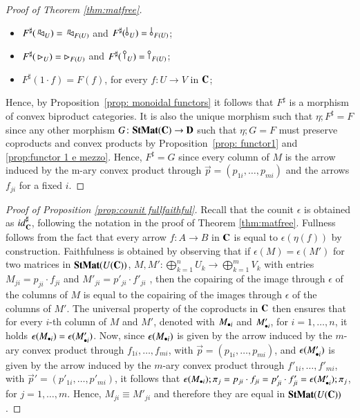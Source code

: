 \begin{proof}[Proof of Theorem \ref{thm:matfree}]
    \begin{itemize}
    \item $F^\sharp(\,^p\!\! \lhd_{U})=\, ^p\!\! \lhd_{F(U)}$ and $F^\sharp(\,\bangp{U})=\, \bangp{F(U)}$;
    \item $F^\sharp(\,\rhd_{U})= \rhd_{F(U)}$ and $F^\sharp(\,\cobang{U})= \cobang{F(U)}$;
    \item $F^\sharp(1\cdot f)= F(f)$, for every $f\colon U\to V$ in $\mathbf{C}$;
    \end{itemize}
     Hence, by Proposition~\ref{prop: monoidal functors} it follows that $F^\sharp$ is a morphism of convex biproduct categories. It is also the unique morphism such that $\eta;F^\sharp = F$ since any other morphism $G\colon\mathbf{StMat}(\mathbf{C})\to \mathbf{D}$ such that $\eta;G=F$ must preserve coproducts and convex products by Proposition~\ref{prop: functor1} and \ref{prop:functor 1 e mezzo}. Hence, $F^\sharp= G$ since every column of $M$ is the arrow induced by the m-ary convex product through $\vec{p}=(p_{1i},\dots,p_{mi})$ and the arrows $f_{ji}$ for a fixed $i$. 
    \end{proof}


\begin{proof}[Proof of Proposition \ref{prop:counit fullfaithful}]\label{proof:counit fullfaithful}
    Recall that the counit $\epsilon$ is obtained as ${id}_{\mathbf{C}}^\sharp$, following the notation in the proof of Theorem \ref{thm:matfree}. Fullness follows from the fact that every arrow $f\colon A\to B$ in $\mathbf{C}$ is equal to $\epsilon(\eta(f))$ by construction. Faithfulness is obtained by observing that if $\epsilon(M)=\epsilon(M')$ for two matrices in $\mathbf{StMat}(U(\mathbf{C}))$, $M,M'\colon\bigoplus_{k=1}^n U_k\to \bigoplus_{k=1}^m V_k$ with entries $M_{ji}= p_{ji}\cdot f_{ji}$ and $M'_{ji}= p'_{ji}\cdot f'_{ji}$ , then the copairing of the image through $\epsilon$ of the columns of $M$ is equal to the copairing of the images through $\epsilon$ of the columns of $M'$. The universal property of the coproducts in $\mathbf{C}$ then ensures that for every $i$-th column of $M$ and $M'$, denoted with $M_{\bullet i}$ and $M'_{\bullet i}$, for $i=1,\dots,n$, it holds $\epsilon(M_{\bullet i})=\epsilon(M'_{\bullet i})$. Now, since $\epsilon(M_{\bullet i})$ is given by the arrow induced by the $m$-ary convex product through $f_{1i},\dots,f_{mi}$, with $\vec{p}=(p_{1i},\dots,p_{mi})$, and $\epsilon(M'_{\bullet i})$ is given by the arrow induced by the $m$-ary convex product through $f'_{1i},\dots,f'_{mi}$, with $\vec{p}'=(p'_{1i},\dots,p'_{mi})$, it follows that $\epsilon(M_{\bullet i});\pi_j=p_{ji}\cdot f_{ji}=p'_{ji}\cdot f'_{ji} =\epsilon(M'_{\bullet i});\pi_{j}$, for $j=1,\dots,m$. Hence, $M_{ji}\equiv M'_{ji}$ and therefore they are equal in $\mathbf{StMat}(U(\mathbf{C}))$.  
    \end{proof} 